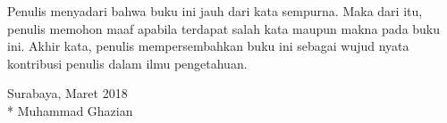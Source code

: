 Penulis menyadari bahwa buku ini jauh dari kata sempurna. Maka dari itu, penulis memohon maaf apabila terdapat salah kata maupun makna pada buku ini. Akhir kata, penulis mempersembahkan buku ini sebagai wujud nyata kontribusi penulis dalam ilmu pengetahuan.

\begin{flushright}
Surabaya, Maret 2018 \\*
\vspace{5em}
Muhammad Ghazian
\end{flushright}